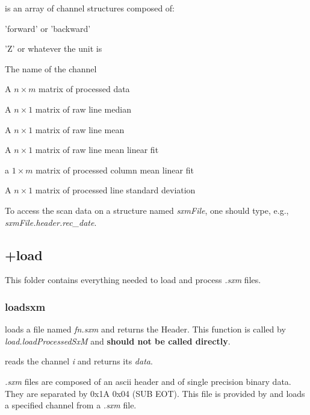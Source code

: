 \item[channels] is an array of channel structures composed of:
  \bdf
  \item[Direction] 'forward' or 'backward'
  \item[Unit] 'Z' or whatever the unit is
  \item[Name] The name of the channel
  \item[data] A $n\times m$ matrix of processed data
  \item[lineMedian] A $n\times 1$ matrix of raw line median
  \item[lineMean] A $n\times 1$ matrix of raw line mean
  \item[linePlane] A $n\times 1$ matrix of raw line mean linear fit
  \item[lineResidualSlope] a $1\times m$ matrix of processed column mean linear fit
  \item[lineStd] A $n\times 1$ matrix of processed line standard deviation
  \edf
\edf

To access the scan data on a structure named \emph{sxmFile}, one should type, e.g., \emph{sxmFile.header.rec\_date}.

\subsection{+load}
This folder contains everything needed to load and process \emph{.sxm} files.
\subsubsection{loadsxm}
\bdf

 loads a file named \emph{fn.sxm} and returns the Header. This function is called by \emph{load.loadProcessedSxM} and \textbf{should not be called directly}.

 reads the channel \emph{i} and returns its \emph{data}.

\edf

\emph{.sxm} files are composed of an ascii header and of single precision binary data. They are separated by 0x1A 0x04 (SUB EOT).
This file is provided by \nanonis{} and loads a specified channel from a \emph{.sxm} file.
